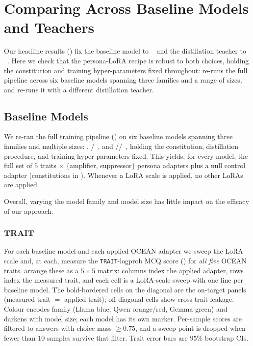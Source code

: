 \FloatBarrier

\section{Comparing Across Baseline Models and Teachers}\label{sec:appendix-comparisons}

Our headline results () fix the baseline model to
\LlamaThreePointOneSizeEightBInstruct~\citep{grattafiori2024llama} and the distillation teacher to \GLMFourPointFiveAir~\citep{zai2025glm45}. Here we check
that the persona-LoRA recipe is robust to both choices, holding the constitution
and training hyper-parameters fixed throughout: 
re-runs the full pipeline across six baseline models spanning three families and
a range of sizes, and  re-runs it with a
different distillation teacher.

\subsection{Baseline Models}\label{sec:appendix-cross-model}

We re-ran the full training pipeline () on six baseline
models spanning three families and multiple sizes: \LlamaThreePointOneSizeEightBInstruct,
\QwenThreeSizeEightB/\QwenThreeSizeThirtyTwoB~\citep{qwen2025qwen3}, and
\GemmaThreeSizeFourBIT/\GemmaThreeSizeTwelveBIT/\GemmaThreeSizeTwentySevenBIT~\citep{gemma_2025}, holding the constitution, distillation
procedure, and training hyper-parameters fixed. This yields, for every model, the
full set of $5$ traits $\times$ $\{$amplifier, suppressor$\}$ persona adapters
plus a null control adapter (constitutions in ).
Whenever a LoRA scale is applied, no other LoRAs
are applied.

Overall, varying the model family and model size has little impact on the efficacy
of our approach.

\subsubsection{TRAIT}

For each baseline model and each applied OCEAN adapter we sweep the LoRA scale
and, at each, measure the \texttt{TRAIT}-logprob MCQ score ()
for \emph{all five} OCEAN traits.
 arrange these as a
$5\times 5$ matrix: columns index the applied adapter, rows index the measured
trait, and each cell is a LoRA-scale sweep with one line per baseline model. The
bold-bordered cells on the diagonal are the on-target panels (measured trait $=$
applied trait); off-diagonal cells show cross-trait leakage. Colour encodes family
(Llama blue, Qwen orange/red, Gemma green) and darkens with model size; each model
has its own marker. Per-sample scores are filtered to answers with choice mass
$\geq 0.75$, and a sweep point is dropped when fewer than $10$ samples survive
that filter. Trait error bars are $95\%$ bootstrap CIs.

